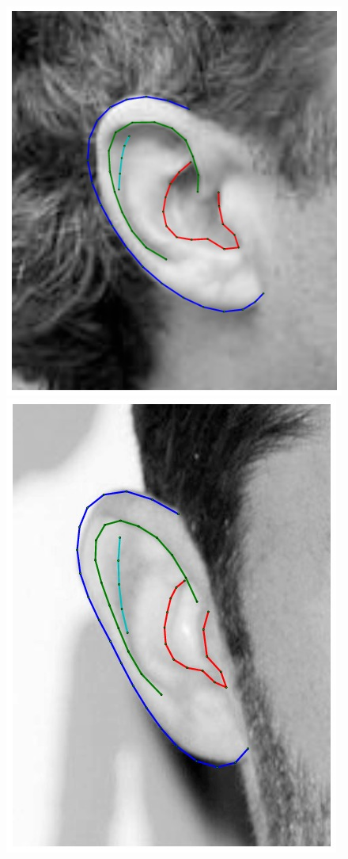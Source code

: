 \begin{figure}
    \hfill
    \includegraphics[height=\flowhh]{resources/Ear_Deformable_Model/fittings/final_0015}
    \hfill
    \includegraphics[height=\flowhh]{resources/Ear_Deformable_Model/fittings/final_0024}

\end{figure}
